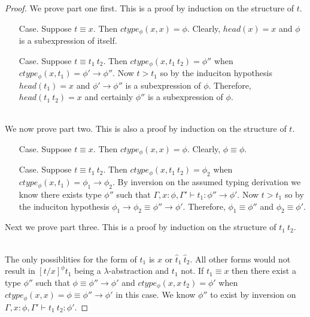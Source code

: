 \begin{proof}
 We prove part one first. This is a proof by induction on the structure of $t$.

\begin{itemize}
\item[Case.] Suppose $t \equiv x$.  Then $ctype_\phi(x,x) = \phi$.  Clearly,
  $head(x) = x$ and $\phi$ is a subexpression of itself.
  
\item[Case.] Suppose $t \equiv t_1\ t_2$.  Then $ctype_\phi(x,t_1\ t_2) = \phi''$
  when $ctype_\phi(x,t_1) = \phi' \to \phi''$.  Now $t > t_1$ so by the induciton
  hypothesis $head(t_1) = x$ and $\phi' \to \phi''$ is a subexpression of $\phi$.
  Therefore, $head(t_1\ t_2) = x$ and certainly $\phi''$ is a subexpression of $\phi$.
\end{itemize}

\ \\
We now prove part two.  This is also a proof by induction on the structure of $t$.

\begin{itemize}
\item[Case.] Suppose $t \equiv x$.  Then $ctype_\phi(x,x) = \phi$.  Clearly,
  $\phi \equiv \phi$.
  
\item[Case.] Suppose $t \equiv t_1\ t_2$.  Then $ctype_\phi(x,t_1\ t_2) = \phi_2$
  when $ctype_\phi(x,t_1) = \phi_1 \to \phi_2$.  By inversion on the assumed typing
  derivation we know there exists type $\phi''$ such that $\Gamma,x:\phi,\Gamma' \vdash t_1:\phi'' \to \phi'$.
  Now $t > t_1$ so by the induciton hypothesis $\phi_1 \to \phi_2 \equiv \phi'' \to \phi'$.
  Therefore, $\phi_1 \equiv \phi''$ and $\phi_2 \equiv \phi'$.
\end{itemize}

\noindent 
Next we prove part three.  This is a proof by induction on the structure of $t_1\ t_2$.

\ \\
The only possiblities for the form of $t_1$ is $x$ or $\hat{t}_1\ \hat{t}_2$.  All other 
forms would not result in $[t/x]^\phi t_1$ being a $\lambda$-abstraction and $t_1$ not.
If $t_1 \equiv x$ then there exist a type $\phi''$ such that $\phi \equiv \phi'' \to \phi'$ and
$ctype_\phi(x,x\ t_2) = \phi'$ when $ctype_\phi(x,x) = \phi \equiv \phi'' \to \phi'$ in this case.  We know
$\phi''$ to exist by inversion on $\Gamma,x:\phi,\Gamma' \vdash t_1\ t_2:\phi'$.


\end{proof}
